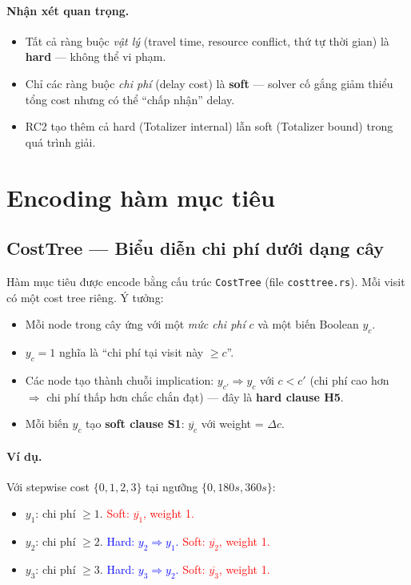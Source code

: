 \documentclass[11pt,a4paper]{article}
\begin{document}
\paragraph{Nhận xét quan trọng.}
\begin{itemize}
  \item Tất cả ràng buộc \emph{vật lý} (travel time, resource conflict, thứ tự thời gian) là \textbf{hard} --- không thể vi phạm.
  \item Chỉ các ràng buộc \emph{chi phí} (delay cost) là \textbf{soft} --- solver cố gắng giảm thiểu tổng cost nhưng có thể ``chấp nhận'' delay.
  \item RC2 tạo thêm cả hard (Totalizer internal) lẫn soft (Totalizer bound) trong quá trình giải.
\end{itemize}


\section{Encoding hàm mục tiêu}

\subsection{CostTree --- Biểu diễn chi phí dưới dạng cây}

Hàm mục tiêu được encode bằng cấu trúc \texttt{CostTree} (file \texttt{costtree.rs}). Mỗi visit có một cost tree riêng. Ý tưởng:

\begin{itemize}
  \item Mỗi node trong cây ứng với một \emph{mức chi phí} $c$ và một biến Boolean $y_c$.
  \item $y_c = 1$ nghĩa là ``chi phí tại visit này $\geq c$''.
  \item Các node tạo thành chuỗi implication: $y_{c'} \Rightarrow y_c$ với $c < c'$ (chi phí cao hơn $\Rightarrow$ chi phí thấp hơn chắc chắn đạt) --- đây là \textbf{hard clause H5}.
  \item Mỗi biến $y_c$ tạo \textbf{soft clause S1}: $\overline{y_c}$ với weight = $\Delta c$.
\end{itemize}

\paragraph{Ví dụ.} Với stepwise cost $\{0, 1, 2, 3\}$ tại ngưỡng $\{0, 180s, 360s\}$:
\begin{itemize}
  \item $y_1$: chi phí $\geq 1$. \textcolor{red}{Soft: $\overline{y_1}$, weight 1.}
  \item $y_2$: chi phí $\geq 2$. \textcolor{blue}{Hard: $y_2 \Rightarrow y_1$.} \textcolor{red}{Soft: $\overline{y_2}$, weight 1.}
  \item $y_3$: chi phí $\geq 3$. \textcolor{blue}{Hard: $y_3 \Rightarrow y_2$.} \textcolor{red}{Soft: $\overline{y_3}$, weight 1.}
\end{itemize}
\end{document}
